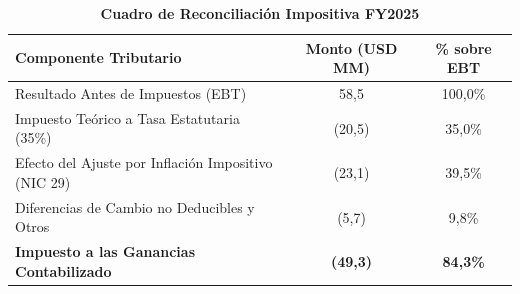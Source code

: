 \documentclass[10pt,a4paper]{article}
\begin{document}
\begin{table}[H]
\centering
\caption{\textbf{Cuadro de Reconciliación Impositiva FY2025}}
\small
\begin{tabularx}{\textwidth}{Xcc}
\toprule
\textbf{Componente Tributario} & \textbf{Monto (USD MM)} & \textbf{\% sobre EBT} \\
\midrule
Resultado Antes de Impuestos (EBT) & 58,5 & 100,0\% \\
Impuesto Teórico a Tasa Estatutaria (35\%) & (20,5) & 35,0\% \\
Efecto del Ajuste por Inflación Impositivo (NIC 29) & (23,1) & 39,5\% \\
Diferencias de Cambio no Deducibles y Otros & (5,7) & 9,8\% \\
\midrule
\textbf{Impuesto a las Ganancias Contabilizado} & \textbf{(49,3)} & \textbf{84,3\%} \\
\bottomrule
\end{tabularx}
\end{table}
\end{document}
